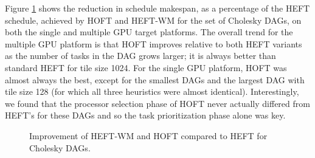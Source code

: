 \documentclass[runningheads]{llncs}
\begin{document}
Figure \ref{plot.hoft_cholesky} shows the reduction in schedule makespan, as a percentage of the HEFT schedule, achieved by HOFT and HEFT-WM for the set of Cholesky DAGs, on both the single and multiple GPU target platforms. The overall trend for the multiple GPU platform is that HOFT improves relative to both HEFT variants as the number of tasks in the DAG grows larger; it is always better than standard HEFT for tile size 1024. For the single GPU platform, HOFT was almost always the best, except for the smallest DAGs and the largest DAG with tile size 128 (for which all three heuristics were almost identical). Interestingly, we found that the processor selection phase of HOFT never actually differed from HEFT's for these DAGs and so the task prioritization phase alone was key. 
\begin{figure}
	\centering	
	\caption{Improvement of HEFT-WM and HOFT compared to HEFT for Cholesky DAGs.}	
	\label{plot.hoft_cholesky}
\end{figure} 
\end{document}
